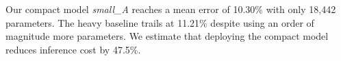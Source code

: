 \documentclass{article}
\begin{document}
Our compact model \emph{small\_A} reaches a mean error of 10.30\% with only
18{,}442 parameters. The heavy baseline trails at 11.21\% despite using an
order of magnitude more parameters. We estimate that deploying the compact
model reduces inference cost by 47.5\%.


\end{document}
